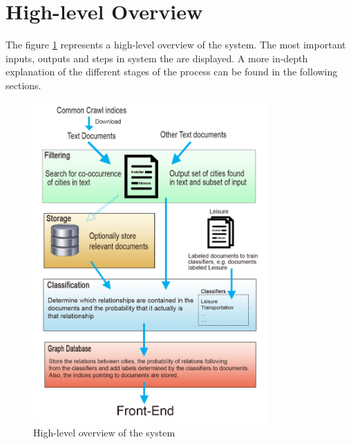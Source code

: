 \section{High-level Overview}
The figure \ref{fig:overview} represents a high-level overview of the system. The most important inputs, outputs and steps in system the are displayed. A more in-depth explanation of the different stages of the process can be found in the following sections.

\begin{figure}[ht]
\centering
\includegraphics[width=0.8\textwidth]{System-overview-3}
\caption{High-level overview of the system}
\label{fig:overview}
\end{figure}